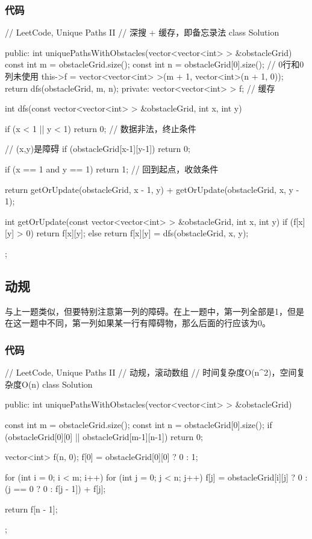 \subsubsection{代码}
\begin{Code}
	// LeetCode, Unique Paths II
	// 深搜 + 缓存，即备忘录法
	class Solution {
		public:
		int uniquePathsWithObstacles(vector<vector<int> > &obstacleGrid) {
			const int m = obstacleGrid.size();
			const int n = obstacleGrid[0].size();
			// 0行和0列未使用
			this->f = vector<vector<int> >(m + 1, vector<int>(n + 1, 0));
			return dfs(obstacleGrid, m, n);
		}
		private:
		vector<vector<int> > f;  // 缓存
		
		int dfs(const vector<vector<int> > &obstacleGrid,
		int x, int y) {
			if (x < 1 || y < 1) return 0; // 数据非法，终止条件
			
			// (x,y)是障碍
			if (obstacleGrid[x-1][y-1]) return 0;
			
			if (x == 1 and y == 1) return 1; // 回到起点，收敛条件
			
			return getOrUpdate(obstacleGrid, x - 1, y) +
			getOrUpdate(obstacleGrid, x, y - 1);
		}
		
		int getOrUpdate(const vector<vector<int> > &obstacleGrid,
		int x, int y) {
			if (f[x][y] > 0) return f[x][y];
			else return f[x][y] = dfs(obstacleGrid, x, y);
		}
	};
\end{Code}


\subsection{动规}
与上一题类似，但要特别注意第一列的障碍。在上一题中，第一列全部是1，但是在这一题中不同，第一列如果某一行有障碍物，那么后面的行应该为0。


\subsubsection{代码}
\begin{Code}
	// LeetCode, Unique Paths II
	// 动规，滚动数组
	// 时间复杂度O(n^2)，空间复杂度O(n)
	class Solution {
		public:
		int uniquePathsWithObstacles(vector<vector<int> > &obstacleGrid) {
			const int m = obstacleGrid.size();
			const int n = obstacleGrid[0].size();
			if (obstacleGrid[0][0] || obstacleGrid[m-1][n-1]) return 0;
			
			vector<int> f(n, 0);
			f[0] = obstacleGrid[0][0] ? 0 : 1;
			
			for (int i = 0; i < m; i++)
			for (int j = 0; j < n; j++)
			f[j] = obstacleGrid[i][j] ? 0 : (j == 0 ? 0 : f[j - 1]) + f[j];
			
			return f[n - 1];
		}
	};
\end{Code}


